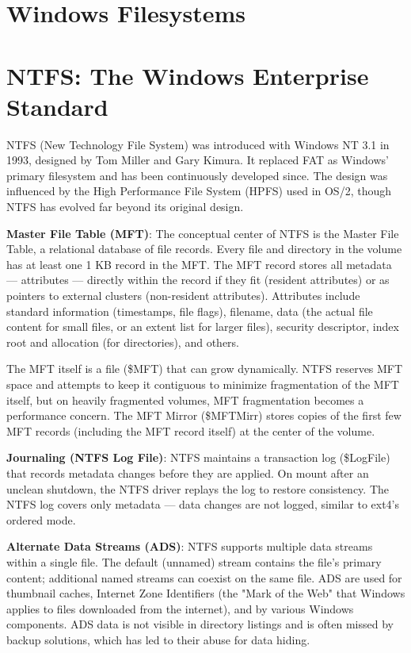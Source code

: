 \section{Windows Filesystems}
\section{NTFS: The Windows Enterprise Standard}
NTFS (New Technology File System) was introduced with Windows NT 3.1 in 1993, designed by Tom Miller and Gary Kimura. It replaced FAT as Windows'{} primary filesystem and has been continuously developed since. The design was influenced by the High Performance File System (HPFS) used in OS/2, though NTFS has evolved far beyond its original design.

\textbf{Master File Table (MFT)}: The conceptual center of NTFS is the Master File Table, a relational database of file records. Every file and directory in the volume has at least one 1 KB record in the MFT. The MFT record stores all metadata --- attributes --- directly within the record if they fit (resident attributes) or as pointers to external clusters (non-resident attributes). Attributes include standard information (timestamps, file flags), filename, data (the actual file content for small files, or an extent list for larger files), security descriptor, index root and allocation (for directories), and others.

The MFT itself is a file (\$MFT) that can grow dynamically. NTFS reserves MFT space and attempts to keep it contiguous to minimize fragmentation of the MFT itself, but on heavily fragmented volumes, MFT fragmentation becomes a performance concern. The MFT Mirror (\$MFTMirr) stores copies of the first few MFT records (including the MFT record itself) at the center of the volume.

\textbf{Journaling (NTFS Log File)}: NTFS maintains a transaction log (\$LogFile) that records metadata changes before they are applied. On mount after an unclean shutdown, the NTFS driver replays the log to restore consistency. The NTFS log covers only metadata --- data changes are not logged, similar to ext4's ordered mode.

\textbf{Alternate Data Streams (ADS)}: NTFS supports multiple data streams within a single file. The default (unnamed) stream contains the file's primary content; additional named streams can coexist on the same file. ADS are used for thumbnail caches, Internet Zone Identifiers (the "Mark of the Web" that Windows applies to files downloaded from the internet), and by various Windows components. ADS data is not visible in directory listings and is often missed by backup solutions, which has led to their abuse for data hiding.

